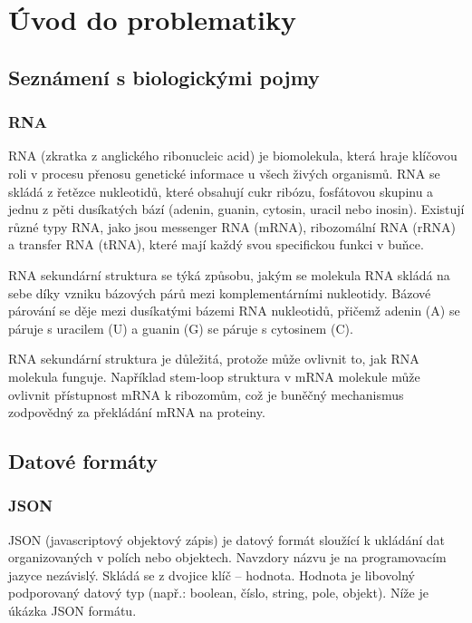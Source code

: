 
\chapter{Úvod do problematiky}

\section {Seznámení s biologickými pojmy}

\subsection{RNA} 

RNA (zkratka z anglického ribonucleic acid) je biomolekula, která hraje
klíčovou roli v procesu přenosu genetické informace u všech živých organismů.
RNA se skládá z řetězce nukleotidů, které obsahují cukr ribózu, fosfátovou
skupinu a jednu z pěti dusíkatých bází (adenin, guanin, cytosin, uracil nebo
inosin). Existují různé typy RNA, jako jsou messenger RNA (mRNA), ribozomální
RNA (rRNA) a transfer RNA (tRNA), které mají každý svou specifickou funkci v
buňce.

RNA sekundární struktura se týká způsobu, jakým se molekula RNA skládá na sebe
díky vzniku bázových párů mezi komplementárními nukleotidy. Bázové párování se
děje mezi dusíkatými bázemi RNA nukleotidů, přičemž adenin (A) se páruje s
uracilem (U) a guanin (G) se páruje s cytosinem (C).

RNA sekundární struktura je důležitá, protože může ovlivnit to, jak RNA
molekula funguje. Například stem-loop struktura v mRNA molekule může ovlivnit
přístupnost mRNA k ribozomům, což je buněčný mechanismus zodpovědný za
překládání mRNA na proteiny.

\section {Datové formáty}

\subsection{JSON} 

JSON (javascriptový objektový zápis) je datový formát sloužící k ukládání dat
organizovaných v polích nebo objektech. Navzdory názvu je na programovacím
jazyce nezávislý. Skládá se z dvojice klíč -- hodnota. Hodnota je libovolný
podporovaný datový typ (např.: boolean, číslo, string, pole, objekt). Níže je
úkázka JSON formátu.

